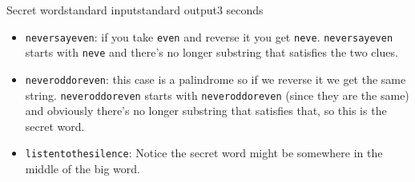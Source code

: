 \begin{problem}{Secret word}{standard input}{standard output}{3 seconds}
\begin{itemize}
  \item{\texttt{neversayeven}: if you take \texttt{even} and reverse it you get \texttt{neve}. \texttt{neversayeven} starts with \texttt{neve} and there's no longer substring that satisfies the two clues.}
  
  \item{\texttt{neveroddoreven}: this case is a palindrome so if we reverse it we get the same string. \texttt{neveroddoreven} starts with \texttt{neveroddoreven} (since they are the same) and obviously there's no longer substring that satisfies that, so this is the secret word.}
  
  \item{\texttt{listentothesilence}: Notice the secret word might be somewhere in the middle of the big word.}
\end{itemize}


\end{problem}
